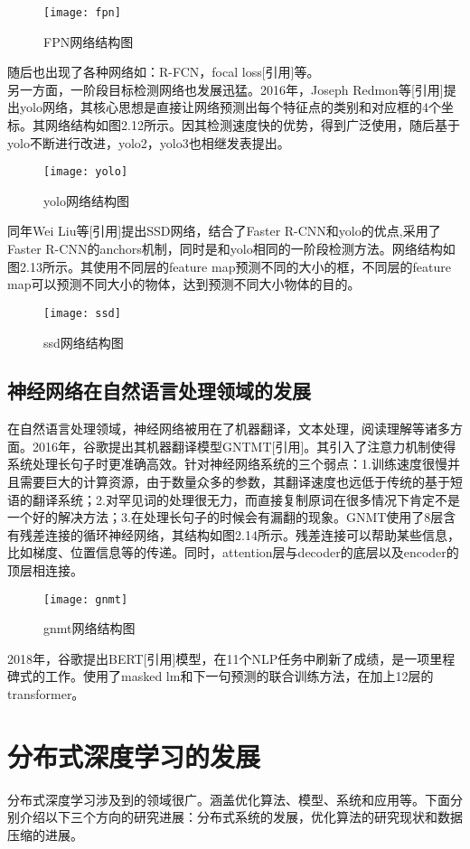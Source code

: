 \begin{figure}[htp]
\centering
\texttt{[image: fpn]}
\caption{FPN网络结构图}
\end{figure}
随后也出现了各种网络如：R-FCN，focal loss[引用]等。\\
另一方面，一阶段目标检测网络也发展迅猛。2016年，Joseph Redmon等[引用]提出yolo网络，其核心思想是直接让网络预测出每个特征点的类别和对应框的4个坐标。其网络结构如图2.12所示。因其检测速度快的优势，得到广泛使用，随后基于yolo不断进行改进，yolo2，yolo3也相继发表提出。\\
\begin{figure}[htp]
\centering
\texttt{[image: yolo]}
\caption{yolo网络结构图}
\end{figure}
同年Wei Liu等[引用]提出SSD网络，结合了Faster R-CNN和yolo的优点,采用了Faster R-CNN的anchors机制，同时是和yolo相同的一阶段检测方法。网络结构如图2.13所示。其使用不同层的feature map预测不同的大小的框，不同层的feature map可以预测不同大小的物体，达到预测不同大小物体的目的。\\
\begin{figure}[htp]
\centering
\texttt{[image: ssd]}
\caption{ssd网络结构图}
\end{figure}
\subsection{神经网络在自然语言处理领域的发展}
在自然语言处理领域，神经网络被用在了机器翻译，文本处理，阅读理解等诸多方面。2016年，谷歌提出其机器翻译模型GNTMT[引用]。其引入了注意力机制使得系统处理长句子时更准确高效。针对神经网络系统的三个弱点：1.训练速度很慢并且需要巨大的计算资源，由于数量众多的参数，其翻译速度也远低于传统的基于短语的翻译系统；2.对罕见词的处理很无力，而直接复制原词在很多情况下肯定不是一个好的解决方法；3.在处理长句子的时候会有漏翻的现象。GNMT使用了8层含有残差连接的循环神经网络，其结构如图2.14所示。残差连接可以帮助某些信息，比如梯度、位置信息等的传递。同时，attention层与decoder的底层以及encoder的顶层相连接。\\
\begin{figure}[htp]
\centering
\texttt{[image: gnmt]}
\caption{gnmt网络结构图}
\end{figure}
2018年，谷歌提出BERT[引用]模型，在11个NLP任务中刷新了成绩，是一项里程碑式的工作。使用了masked lm和下一句预测的联合训练方法，在加上12层的transformer。\\
\section{分布式深度学习的发展}
分布式深度学习涉及到的领域很广。涵盖优化算法、模型、系统和应用等。下面分别介绍以下三个方向的研究进展：分布式系统的发展，优化算法的研究现状和数据压缩的进展。\\
